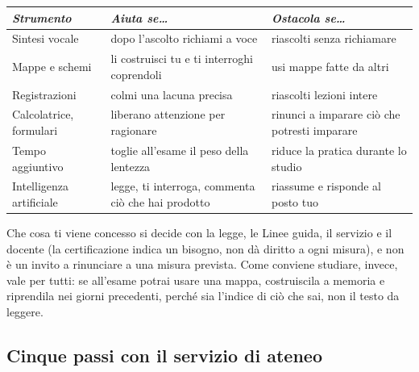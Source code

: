 \begin{center}\footnotesize
  \begin{tabular}{@{}>{\raggedright\arraybackslash}p{}>{\raggedright\arraybackslash}p{}>{\raggedright\arraybackslash}p{}@{}}
    \toprule
    \textit{Strumento} & \textit{Aiuta se\dots} & \textit{Ostacola se\dots} \\
    \midrule
    Sintesi vocale & dopo l'ascolto richiami a voce & riascolti senza
      richiamare \\
    \addlinespace
    Mappe e schemi & li costruisci tu e ti interroghi coprendoli & usi
      mappe fatte da altri \\
    \addlinespace
    Registrazioni & colmi una lacuna precisa & riascolti lezioni intere \\
    \addlinespace
    Calcolatrice, formulari & liberano attenzione per ragionare & rinunci
      a imparare ciò che potresti imparare \\
    \addlinespace
    Tempo aggiuntivo & toglie all'esame il peso della lentezza & riduce
      la pratica durante lo studio \\
    \addlinespace
    Intelligenza artificiale & legge, ti interroga, commenta ciò che hai
      prodotto & riassume e risponde al posto tuo \\
    \bottomrule
  \end{tabular}
\end{center}

{\footnotesize Che cosa ti viene concesso si decide con la legge, le Linee guida, il servizio e il docente (la certificazione indica un bisogno, non dà diritto a ogni misura), e non è un invito a rinunciare a una misura prevista. Come conviene studiare,
invece, vale per tutti: se all'esame potrai usare una mappa, costruiscila
a memoria e riprendila nei giorni precedenti, perché sia l'indice di ciò
che sai, non il testo da leggere.\par}

\subsection*{Cinque passi con il servizio di ateneo}

